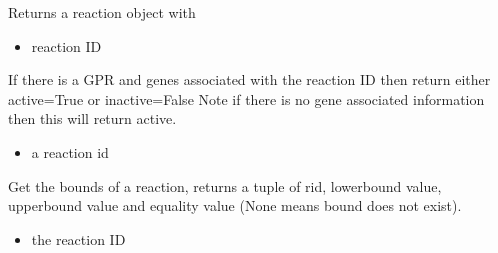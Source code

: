 \documentclass[letterpaper,10pt,english]{sphinxmanual}
\begin{document}
\begin{fulllineitems}
\begin{fulllineitems}
\end{fulllineitems}


\begin{fulllineitems}
\label{\detokenize{modules_doc:cbmpy.CBModel.Model.getReaction}}
\pysigstartsignatures
{}
\pysigstopsignatures
\sphinxAtStartPar
Returns a reaction object with 
\begin{itemize}
\item {} 
\sphinxAtStartPar
{} reaction ID

\end{itemize}

\end{fulllineitems}


\begin{fulllineitems}
\label{\detokenize{modules_doc:cbmpy.CBModel.Model.getReactionActivity}}
\pysigstartsignatures
{}
\pysigstopsignatures
\sphinxAtStartPar
If there is a GPR and genes associated with the reaction ID then return either active=True or inactive=False
Note if there is no gene associated information then this will return active.
\begin{itemize}
\item {} 
\sphinxAtStartPar
{} a reaction id

\end{itemize}

\end{fulllineitems}


\begin{fulllineitems}
\label{\detokenize{modules_doc:cbmpy.CBModel.Model.getReactionBounds}}
\pysigstartsignatures
{}
\pysigstopsignatures
\sphinxAtStartPar
Get the bounds of a reaction, returns a tuple of rid, lowerbound value, upperbound value and equality value (None means bound does not exist).
\begin{itemize}
\item {} 
\sphinxAtStartPar
{} the reaction ID


\end{itemize}
\end{fulllineitems}
\end{fulllineitems}
\end{document}
